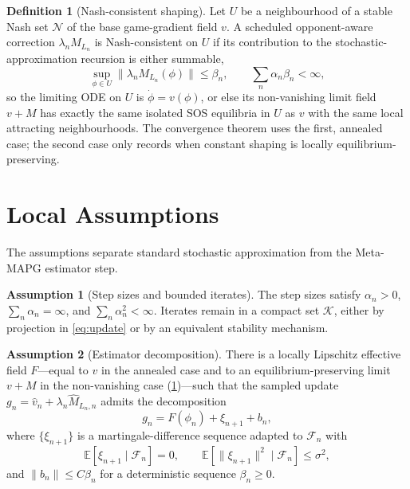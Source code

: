 \documentclass{article}
\theoremstyle{plain}
\theoremstyle{definition}
\newtheorem{assumption}{Assumption}
\newtheorem{definition}[theorem]{Definition}
\theoremstyle{remark}
\newcommand{\E}{\mathbb{E}}
\newcommand{\K}{\mathcal{K}}
\newcommand{\N}{\mathcal{N}}
\newcommand{\F}{\mathcal{F}}
\begin{document}
\begin{definition}[Nash-consistent shaping]\label{def:nash-consistent}
Let $U$ be a neighbourhood of a stable Nash set $\N$ of the base game-gradient field $v$. A scheduled opponent-aware correction $\lambda_n M_{L_n}$ is Nash-consistent on $U$ if its contribution to the stochastic-approximation recursion is either summable,
\[
\sup_{\phi\in U}\|\lambda_n M_{L_n}(\phi)\|\le \beta_n,
\qquad \sum_n \alpha_n\beta_n<\infty,
\]
so the limiting ODE on $U$ is $\dot\phi=v(\phi)$, or else its non-vanishing limit field $v+M$ has exactly the same isolated SOS equilibria in $U$ as $v$ with the same local attracting neighbourhoods. The convergence theorem uses the first, annealed case; the second case only records when constant shaping is locally equilibrium-preserving.
\end{definition}

\section{Local Assumptions}\label{sec:assumptions}

The assumptions separate standard stochastic approximation from the Meta-MAPG estimator step.

\begin{assumption}[Step sizes and bounded iterates]\label{as:steps}
The step sizes satisfy $\alpha_n>0$, $\sum_n\alpha_n=\infty$, and $\sum_n\alpha_n^2<\infty$. Iterates remain in a compact set $\K$, either by projection in \eqref{eq:update} or by an equivalent stability mechanism.
\end{assumption}

\begin{assumption}[Estimator decomposition]\label{as:decomp}
There is a locally Lipschitz effective field $F$---equal to $v$ in the annealed case and to an equilibrium-preserving limit $v+M$ in the non-vanishing case (\cref{def:nash-consistent})---such that the sampled update $g_n=\hat v_n+\lambda_n\hat M_{L_n,n}$ admits the decomposition
\[
g_n=F(\phi_n)+\xi_{n+1}+b_n,
\]
where $\{\xi_{n+1}\}$ is a martingale-difference sequence adapted to $\F_n$ with
\[
\E[\xi_{n+1}\mid\F_n]=0,\qquad
\E[\|\xi_{n+1}\|^2\mid\F_n]\le \sigma^2,
\]
and $\|b_n\|\le C\beta_n$ for a deterministic sequence $\beta_n\ge 0$.
\end{assumption}
\end{document}
